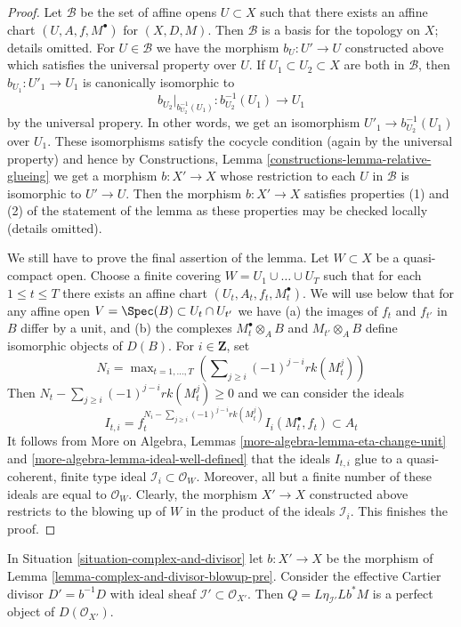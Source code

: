 \begin{proof}
\medskip\noindent
Let $\mathcal{B}$ be the set of affine opens $U \subset X$
such that there exists an affine chart $(U, A, f, M^\bullet)$
for $(X, D, M)$. Then $\mathcal{B}$ is a basis for the topology
on $X$; details omitted. For $U \in \mathcal{B}$ we have
the morphism $b_U : U' \to U$ constructed above which satisfies
the universal property over $U$. If $U_1 \subset U_2 \subset X$
are both in $\mathcal{B}$, then $b_{U_1} : U'_1 \to U_1$
is canonically isomorphic to
$$
b_{U_2}|_{b_{U_2}^{-1}(U_1)} : b_{U_2}^{-1}(U_1) \longrightarrow U_1
$$
by the universal propery. In other words, we get an isomorphism
$U'_1 \to b_{U_2}^{-1}(U_1)$ over $U_1$. These isomorphisms satisfy
the cocycle condition (again by the universal property) and hence by
Constructions, Lemma \ref{constructions-lemma-relative-glueing}
we get a morphism $b : X' \to X$ whose restriction to each
$U$ in $\mathcal{B}$ is isomorphic to $U' \to U$.
Then the morphism $b : X' \to X$ satisfies properties (1) and (2)
of the statement of the lemma as these properties may be checked
locally (details omitted).

\medskip\noindent
We still have to prove the final assertion of the lemma.
Let $W \subset X$ be a quasi-compact open.
Choose a finite covering $W = U_1 \cup \ldots \cup U_T$
such that for each $1 \leq t \leq T$ there exists an affine chart
$(U_t, A_t, f_t, M_t^\bullet)$. We will use below that for any affine
open $V = \Spec(B) \subset U_t \cap U_{t'}$ we have
(a) the images of $f_t$ and $f_{t'}$ in $B$ differ by a unit, and
(b) the complexes $M_t^\bullet \otimes_A B$ and $M_{t'} \otimes_A B$
define isomorphic objects of $D(B)$. For $i \in \mathbf{Z}$, set
$$
N_i = \max\nolimits_{t = 1, \ldots, T}
\left(\sum\nolimits_{j \geq i} (-1)^{j - i} rk(M_t^j)\right)
$$
Then $N_t - \sum\nolimits_{j \geq i} (-1)^{j - i} rk(M_t^j) \geq 0$
and we can consider the ideals
$$
I_{t, i} =
f_t^{N_i - \sum\nolimits_{j \geq i} (-1)^{j - i} rk(M_t^j)}
I_i(M_t^\bullet, f_t)
\subset A_t
$$
It follows from More on Algebra, Lemmas
\ref{more-algebra-lemma-eta-change-unit} and
\ref{more-algebra-lemma-ideal-well-defined}
that the ideals $I_{t, i}$ glue to a quasi-coherent, finite type
ideal $\mathcal{I}_i \subset \mathcal{O}_W$. Moreover, all but
a finite number of these ideals are equal to $\mathcal{O}_W$.
Clearly, the morphism $X' \to X$ constructed above
restricts to the blowing up of $W$ in the product
of the ideals $\mathcal{I}_i$. This finishes the proof.
\end{proof}

\begin{lemma}
\label{lemma-complex-and-divisor-blowup}
In Situation \ref{situation-complex-and-divisor} let $b : X' \to X$
be the morphism of Lemma \ref{lemma-complex-and-divisor-blowup-pre}.
Consider the effective Cartier divisor $D' = b^{-1}D$ with ideal sheaf
$\mathcal{I}' \subset \mathcal{O}_{X'}$. Then $Q = L\eta_{\mathcal{I}'}Lb^*M$
is a perfect object of $D(\mathcal{O}_{X'})$.
\end{lemma}

